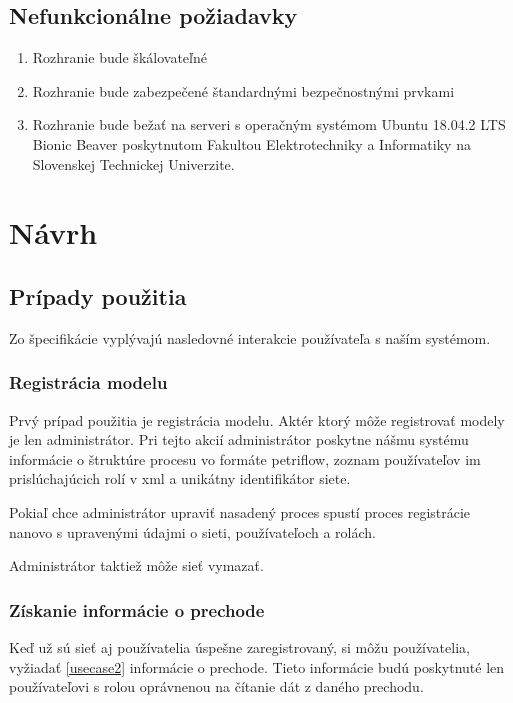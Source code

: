 \subsection{Nefunkcionálne požiadavky}  
\begin{enumerate}  
	
	\item Rozhranie bude škálovateľné  
	
	\item Rozhranie bude zabezpečené štandardnými bezpečnostnými prvkami 

	\item Rozhranie bude bežať na serveri s operačným systémom Ubuntu 18.04.2 LTS Bionic Beaver poskytnutom Fakultou Elektrotechniky a Informatiky na Slovenskej Technickej Univerzite.   
	
\end{enumerate}  



\section{Návrh}  



\subsection{Prípady použitia} 
Zo špecifikácie vyplývajú nasledovné interakcie používateľa s naším systémom. 



\subsubsection{Registrácia modelu} 
Prvý prípad použitia je registrácia modelu. Aktér ktorý môže registrovať modely je len administrátor. Pri tejto akcií administrátor poskytne nášmu systému informácie o štruktúre procesu vo formáte petriflow, zoznam používateľov im prislúchajúcich rolí v \acrshort{xml} a unikátny identifikátor siete.  

Pokiaľ chce administrátor upraviť nasadený proces spustí proces registrácie nanovo s upravenými údajmi o sieti, používateľoch a rolách. 

Administrátor taktiež môže sieť vymazať. 


\subsubsection{Získanie informácie o prechode} 
Keď už sú sieť aj používatelia úspešne zaregistrovaný, si môžu používatelia, vyžiadať \ref{usecase2} informácie o prechode. Tieto informácie budú poskytnuté len používateľovi s rolou oprávnenou na čítanie dát z daného prechodu. 

